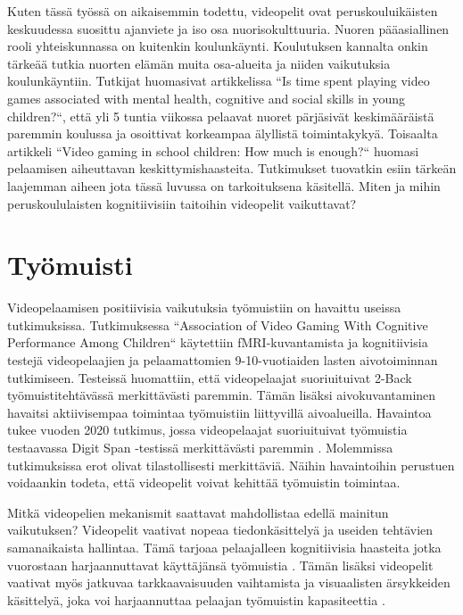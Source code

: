 \documentclass[utf8,bachelor]{gradu3}
\begin{document}
Kuten tässä työssä on aikaisemmin todettu, videopelit ovat peruskouluikäisten keskuudessa suosittu ajanviete ja iso osa nuorisokulttuuria. Nuoren pääasiallinen rooli yhteiskunnassa on kuitenkin koulunkäynti. Koulutuksen kannalta onkin tärkeää tutkia nuorten elämän muita osa-alueita ja niiden vaikutuksia koulunkäyntiin. Tutkijat \textcite{kovess2016time} huomasivat artikkelissa “Is time spent playing video games associated with mental health, cognitive and social skills in young children?“, että yli 5 tuntia viikossa pelaavat nuoret pärjäsivät keskimääräistä paremmin koulussa ja osoittivat korkeampaa älyllistä toimintakykyä. Toisaalta artikkeli “Video gaming in school children: How much is enough?“ \parencite{pujol2016video} huomasi pelaamisen aiheuttavan keskittymishaasteita. Tutkimukset tuovatkin esiin tärkeän laajemman aiheen jota tässä luvussa on tarkoituksena käsitellä. Miten ja mihin peruskoululaisten kognitiivisiin taitoihin videopelit vaikuttavat? 

\section{Työmuisti}

Videopelaamisen positiivisia vaikutuksia työmuistiin on havaittu useissa tutkimuksissa. Tutkimuksessa “Association of Video Gaming With Cognitive Performance Among Children“ \parencite{jamanetworkopen} käytettiin fMRI-kuvantamista ja kognitiivisia testejä videopelaajien ja pelaamattomien 9-10-vuotiaiden lasten aivotoiminnan tutkimiseen. Testeissä huomattiin, että videopelaajat suoriuituivat 2-Back työmuistitehtävässä merkittävästi paremmin. Tämän lisäksi aivokuvantaminen havaitsi aktiivisempaa toimintaa työmuistiin liittyvillä aivoalueilla. Havaintoa tukee vuoden 2020 tutkimus, jossa videopelaajat suoriuituivat työmuistia testaavassa Digit Span -testissä merkittävästi paremmin \parencite{choudhury2022cognitive}. Molemmissa tutkimuksissa erot olivat tilastollisesti merkittäviä. Näihin havaintoihin perustuen voidaankin todeta, että videopelit voivat kehittää työmuistin toimintaa. 

Mitkä videopelien mekanismit saattavat mahdollistaa edellä mainitun vaikutuksen? Videopelit vaativat nopeaa tiedonkäsittelyä ja useiden tehtävien samanaikaista hallintaa. Tämä tarjoaa pelaajalleen kognitiivisia haasteita jotka vuorostaan harjaannuttavat käyttäjänsä työmuistia \parencite{choudhury2022cognitive}. Tämän lisäksi videopelit vaativat myös jatkuvaa tarkkaavaisuuden vaihtamista ja visuaalisten ärsykkeiden käsittelyä, joka voi harjaannuttaa pelaajan työmuistin kapasiteettia \parencite{jamanetworkopen}.  
\end{document}
